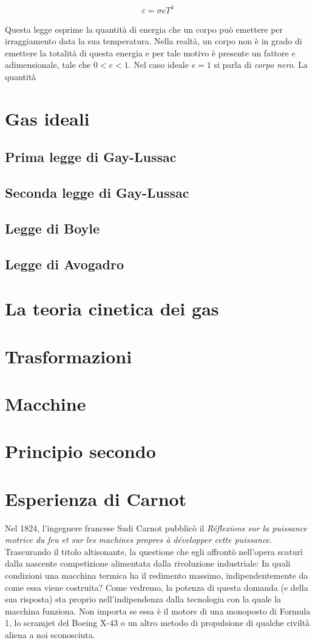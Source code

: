 \begin{align}
    \varepsilon = \sigma e T^4
\end{align}

\noindent Questa legge esprime la quantità di energia che un corpo
può emettere per irraggiamento data la sua temperatura. Nella realtà,
un corpo non è in grado di emettere la totalità di questa energia
e per tale motivo è presente un fattore $e$ adimensionale, tale che
$0 < e < 1$. Nel caso ideale $e = 1$ si parla di \textit{corpo nero}.
La quantità

\section{Gas ideali}

\subsection*{Prima legge di Gay-Lussac}
\subsection*{Seconda legge di Gay-Lussac}
\subsection*{Legge di Boyle}
\subsection*{Legge di Avogadro}

\section{La teoria cinetica dei gas}
\section{Trasformazioni}
\section{Macchine}
\section{Principio secondo}

\section{Esperienza di Carnot}
Nel 1824, l'ingegnere francese Sadi Carnot pubblicò il
\textit{Réflexions sur la puissance motrice du feu et sur les machines
propres à développer cette puissance}. Trascurando il titolo
altisonante, la questione che egli affrontò nell'opera
scaturì dalla nascente competizione alimentata dalla rivoluzione industriale:
In quali condizioni una macchina termica ha il redimento
massimo, indipendentemente da come essa viene costruita? Come
vedremo, la potenza di questa domanda (e della sua risposta) sta
proprio nell'indipendenza dalla tecnologia con la quale la
macchina funziona. Non importa se essa è il motore di una monoposto
di Formula 1, lo scramjet del Boeing X-43 o un altro metodo di
propulsione di qualche civiltà aliena a noi sconosciuta.

